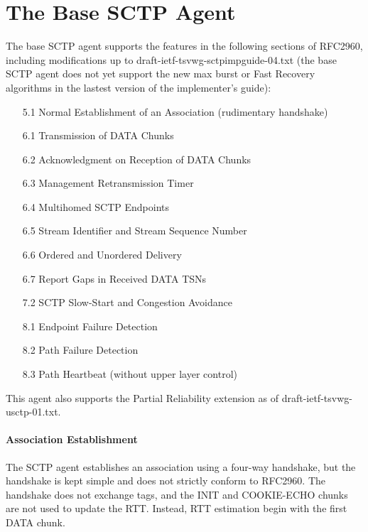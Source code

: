    \section{The Base SCTP Agent}
   \label{sec:baseSctp}

      The base SCTP agent  supports the features in the
      following sections of RFC2960, including modifications up to
      draft-ietf-tsvwg-sctpimpguide-04.txt (the base SCTP agent does not
      yet support the new max burst or Fast Recovery algorithms in the
      lastest version of the implementer's guide):

      \begin{itemize}\itemsep0pt

	 \item[5.1] Normal Establishment of an Association (rudimentary
	 handshake)

	 \item[6.1] Transmission of DATA Chunks

	 \item[6.2] Acknowledgment on Reception of DATA Chunks

	 \item[6.3] Management Retransmission Timer

	 \item[6.4] Multihomed SCTP Endpoints

	 \item[6.5] Stream Identifier and Stream Sequence Number

	 \item[6.6] Ordered and Unordered Delivery 

	 \item[6.7] Report Gaps in Received DATA TSNs

	 \item[7.2] SCTP Slow-Start and Congestion Avoidance

	 \item[8.1] Endpoint Failure Detection

	 \item[8.2] Path Failure Detection

	 \item[8.3] Path Heartbeat (without upper layer control)

      \end{itemize}

      This agent also supports the Partial Reliability extension as of
      draft-ietf-tsvwg-usctp-01.txt.

      \paragraph{Association Establishment} The SCTP agent establishes an
      association using a four-way handshake, but the handshake is kept
      simple and does not strictly conform to RFC2960. The handshake does
      not exchange tags, and the INIT and COOKIE-ECHO chunks are not used
      to update the RTT.  Instead, RTT estimation begin with the first
      DATA chunk.


